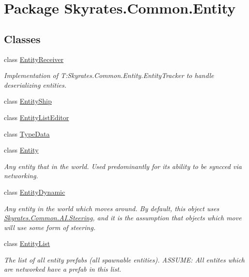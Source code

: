 \hypertarget{namespace_skyrates_1_1_common_1_1_entity}{\section{Package Skyrates.\-Common.\-Entity}
\label{namespace_skyrates_1_1_common_1_1_entity}
}
\subsection*{Classes}
\begin{DoxyCompactItemize}
\item 
class \hyperlink{class_skyrates_1_1_common_1_1_entity_1_1_entity_receiver}{Entity\-Receiver}
\begin{DoxyCompactList}\small\item\em Implementation of T\-:\-Skyrates.\-Common.\-Entity.\-Entity\-Tracker to handle deserializing entities. \end{DoxyCompactList}\item 
class \hyperlink{class_skyrates_1_1_common_1_1_entity_1_1_entity_ship}{Entity\-Ship}
\item 
class \hyperlink{class_skyrates_1_1_common_1_1_entity_1_1_entity_list_editor}{Entity\-List\-Editor}
\item 
class \hyperlink{class_skyrates_1_1_common_1_1_entity_1_1_type_data}{Type\-Data}
\item 
class \hyperlink{class_skyrates_1_1_common_1_1_entity_1_1_entity}{Entity}
\begin{DoxyCompactList}\small\item\em Any entity that in the world. Used predominantly for its ability to be syncced via networking. \end{DoxyCompactList}\item 
class \hyperlink{class_skyrates_1_1_common_1_1_entity_1_1_entity_dynamic}{Entity\-Dynamic}
\begin{DoxyCompactList}\small\item\em Any entity in the world which moves around. By default, this object uses \hyperlink{class_skyrates_1_1_common_1_1_a_i_1_1_steering}{Skyrates.\-Common.\-A\-I.\-Steering}, and it is the assumption that objects which move will use some form of steering. \end{DoxyCompactList}\item 
class \hyperlink{class_skyrates_1_1_common_1_1_entity_1_1_entity_list}{Entity\-List}
\begin{DoxyCompactList}\small\item\em The list of all entity prefabs (all spawnable entities). A\-S\-S\-U\-M\-E\-: All entites which are networked have a prefab in this list. \end{DoxyCompactList}\item 

\end{DoxyCompactItemize}
